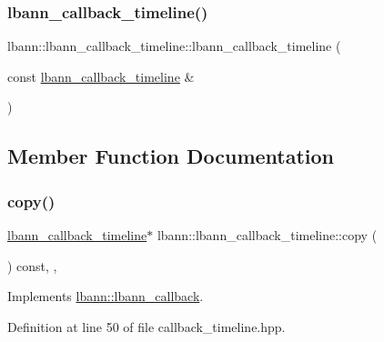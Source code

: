 \subsubsection{\texorpdfstring{lbann\+\_\+callback\+\_\+timeline()}{lbann\_callback\_timeline()}\hspace{0.1cm}{\footnotesize\ttfamily [2/2]}}
{\footnotesize\ttfamily lbann\+::lbann\+\_\+callback\+\_\+timeline\+::lbann\+\_\+callback\+\_\+timeline (\begin{DoxyParamCaption}\item[{const \hyperlink{classlbann_1_1lbann__callback__timeline}{lbann\+\_\+callback\+\_\+timeline} \&}]{ }\end{DoxyParamCaption})\hspace{0.3cm}{\ttfamily [default]}}



\subsection{Member Function Documentation}
\mbox{\label{classlbann_1_1lbann__callback__timeline_aa1359380162f29838be3cdb0bb25b3e3}} 
\subsubsection{\texorpdfstring{copy()}{copy()}}
{\footnotesize\ttfamily \hyperlink{classlbann_1_1lbann__callback__timeline}{lbann\+\_\+callback\+\_\+timeline}$\ast$ lbann\+::lbann\+\_\+callback\+\_\+timeline\+::copy (\begin{DoxyParamCaption}{ }\end{DoxyParamCaption}) const\hspace{0.3cm}{\ttfamily [inline]}, {\ttfamily [override]}, {\ttfamily [virtual]}}



Implements \hyperlink{classlbann_1_1lbann__callback_a9f545d1269a8c7af335625d049691f26}{lbann\+::lbann\+\_\+callback}.



Definition at line 50 of file callback\+\_\+timeline.\+hpp.


